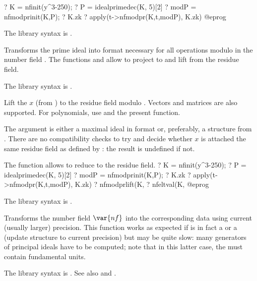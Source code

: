 \bprog
? K = nfinit(y^3-250);
? P = idealprimedec(K, 5)[2]
? modP = nfmodprinit(K,P);
? K.zk
? apply(t->nfmodpr(K,t,modP), K.zk)
@eprog

The library syntax is .

\label{se:nfmodprinit}
Transforms the prime ideal  into  format necessary
for all operations modulo  in the number field .
The functions  and  allow to project
to and lift from the residue field.

The library syntax is .

\label{se:nfmodprlift}
Lift the  $x$ (from ) to the residue field
modulo . Vectors and matrices are also supported. For polynomials,
use  and the present function.

The argument  is either a maximal ideal in 
format or, preferably, a  structure from .
There are no compatibility checks to try and decide whether $x$ is attached
the same residue field as defined by : the result is undefined
if not.

The function  allows to reduce to the residue field.
\bprog
? K = nfinit(y^3-250);
? P = idealprimedec(K, 5)[2]
? modP = nfmodprinit(K,P);
? K.zk
? apply(t->nfmodpr(K,t,modP), K.zk)
? nfmodprlift(K, %
? nfeltval(K, %
@eprog

The library syntax is .

\label{se:nfnewprec}
Transforms the number field $\var{nf}$
into the corresponding data using current (usually larger) precision. This
function works as expected if  is in fact a  or a 
(update structure to current precision) but may be quite slow: many
generators of principal ideals have to be computed; note that in this latter
case, the  must contain fundamental units.

The library syntax is .
See also  and
.

